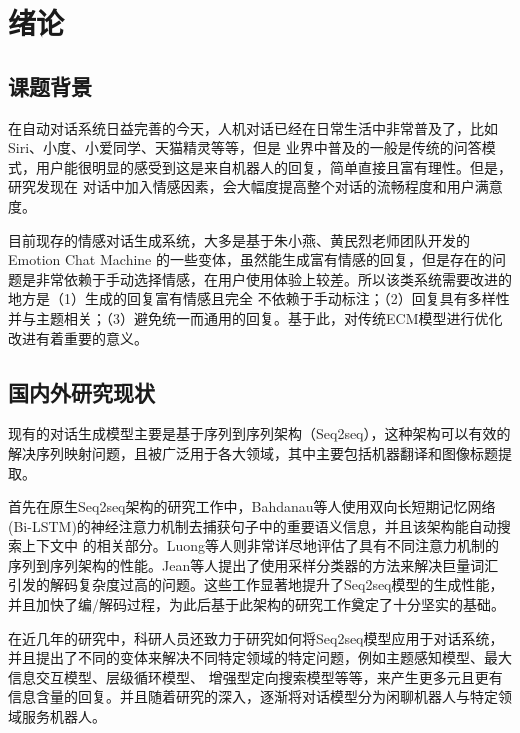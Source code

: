 \documentclass[supercite]{HustGraduPaper}
\theoremstyle{definition}
\begin{document}
\tableofcontents[level=2]
\clearpage


\section{绪论}

\subsection{课题背景}
在自动对话系统日益完善的今天，人机对话已经在日常生活中非常普及了，比如Siri、小度、小爱同学、天猫精灵等等，但是
业界中普及的一般是传统的问答模式，用户能很明显的感受到这是来自机器人的回复，简单直接且富有理性。但是，研究发现在
对话中加入情感因素，会大幅度提高整个对话的流畅程度和用户满意度。

目前现存的情感对话生成系统，大多是基于朱小燕、黄民烈老师团队开发的Emotion Chat Machine\cite{DBLP:journals/corr/ZhouHZZL17}
的一些变体，虽然能生成富有情感的回复\cite{庄寅2021文本情感对话系统研究综述}，但是存在的问题是非常依赖于手动选择情感，在用户使用体验上较差。所以该类系统需要改进的地方是（1）生成的回复富有情感且完全
不依赖于手动标注；（2）回复具有多样性并与主题相关；（3）避免统一而通用的回复。基于此，对传统ECM模型进行优化改进有着重要的意义。

\subsection{国内外研究现状}

现有的对话生成模型主要是基于序列到序列架构（Seq2seq），这种架构可以有效的解决序列映射问题，且被广泛用于各大领域，其中主要包括机器翻译和图像标题提取。

首先在原生Seq2seq架构的研究工作中，Bahdanau\cite{bahdanau2014neural}等人使用双向长短期记忆网络(Bi-LSTM)的神经注意力机制去捕获句子中的重要语义信息，并且该架构能自动搜索上下文中
的相关部分。Luong\cite{luong2015effective}等人则非常详尽地评估了具有不同注意力机制的序列到序列架构的性能。Jean\cite{jean2014using}等人提出了使用采样分类器的方法来解决巨量词汇
引发的解码复杂度过高的问题。这些工作显著地提升了Seq2seq模型的生成性能，并且加快了编/解码过程，为此后基于此架构的研究工作奠定了十分坚实的基础。

在近几年的研究中，科研人员还致力于研究如何将Seq2seq模型应用于对话系统，并且提出了不同的变体来解决不同特定领域的特定问题，例如主题感知模型、最大信息交互模型、层级循环模型、
增强型定向搜索模型等等，来产生更多元且更有信息含量的回复。并且随着研究的深入，逐渐将对话模型分为闲聊机器人与特定领域服务机器人。
\end{document}
